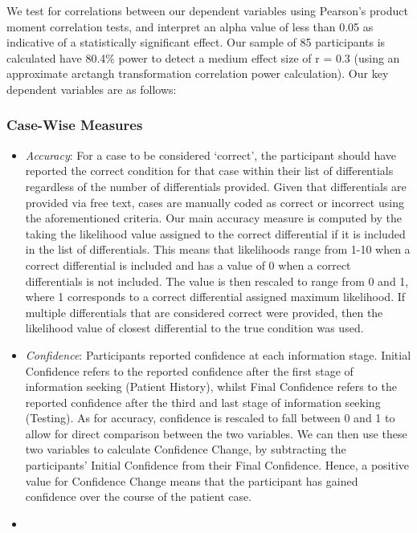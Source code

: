 \documentclass[a4paper, nobind]{templates/ociamthesis}
\begin{document}
We test for correlations between our dependent variables using Pearson's product moment correlation tests, and interpret an alpha value of less than 0.05 as indicative of a statistically significant effect. Our sample of 85 participants is calculated have 80.4\% power to detect a medium effect size of r = 0.3 (using an approximate arctangh transformation correlation power calculation). Our key dependent variables are as follows:

\hypertarget{case-wise-measures}{%
\subsubsection{Case-Wise Measures}\label{case-wise-measures}}

\begin{itemize}
\item
  \emph{Accuracy}: For a case to be considered `correct', the participant should have reported the correct condition for that case within their list of differentials regardless of the number of differentials provided. Given that differentials are provided via free text, cases are manually coded as correct or incorrect using the aforementioned criteria. Our main accuracy measure is computed by the taking the likelihood value assigned to the correct differential if it is included in the list of differentials. This means that likelihoods range from 1-10 when a correct differential is included and has a value of 0 when a correct differentials is not included. The value is then rescaled to range from 0 and 1, where 1 corresponds to a correct differential assigned maximum likelihood. If multiple differentials that are considered correct were provided, then the likelihood value of closest differential to the true condition was used.
\item
  \emph{Confidence}: Participants reported confidence at each information stage. Initial Confidence refers to the reported confidence after the first stage of information seeking (Patient History), whilst Final Confidence refers to the reported confidence after the third and last stage of information seeking (Testing). As for accuracy, confidence is rescaled to fall between 0 and 1 to allow for direct comparison between the two variables. We can then use these two variables to calculate Confidence Change, by subtracting the participants' Initial Confidence from their Final Confidence. Hence, a positive value for Confidence Change means that the participant has gained confidence over the course of the patient case.
\item

\end{itemize}
\end{document}
